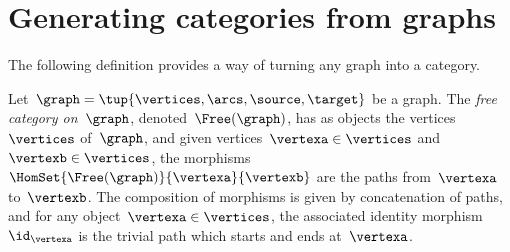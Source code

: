 
\section{Generating categories from graphs}
\label{sec:catsfromgraphs}

The following definition provides a way of turning any graph into a category.

\begin{ctdefinition}
	\label{def:free-category}
	Let~$\graph=\tup{\vertices,\arcs,\source,\target}$ be a graph.
	The \emph{free category on~$\graph$}, denoted~$\Free(\graph)$, has as objects the vertices~$\vertices$ of~$\graph$, and given vertices~$\vertexa\in \vertices$ and~$\vertexb\in \vertices$, the morphisms~$\HomSet{\Free(\graph)}{\vertexa}{\vertexb}$ are the paths from~$\vertexa$ to~$\vertexb$.
	The composition of morphisms is given by concatenation of paths, and for any object~$\vertexa \in \vertices$, the associated identity morphism~$\id_\vertexa$ is the trivial path which starts and ends at~$\vertexa$.
\end{ctdefinition}


